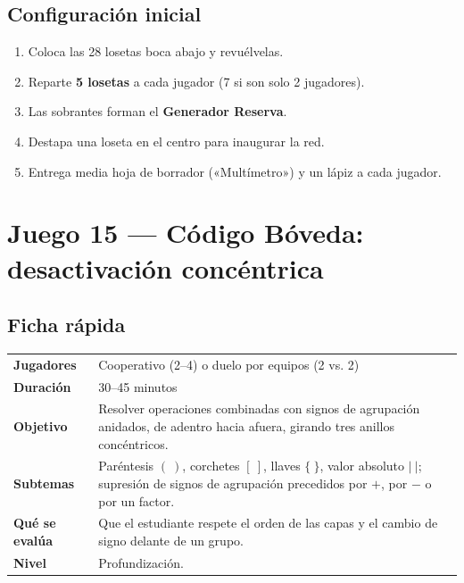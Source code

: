 \documentclass[12pt, letterpaper]{article}
\newcommand{\abs}[1]{\lvert #1\rvert}
\begin{document}
\subsection{Configuración inicial}

\begin{enumerate}[leftmargin=*]
  \item Coloca las 28 losetas boca abajo y revuélvelas.
  \item Reparte \textbf{5 losetas} a cada jugador (7 si son solo 2 jugadores).
  \item Las sobrantes forman el \textbf{Generador Reserva}.
  \item Destapa una loseta en el centro para inaugurar la red.
  \item Entrega media hoja de borrador («Multímetro») y un lápiz a cada jugador.
\end{enumerate}

\clearpage
\section{Juego 15 — Código Bóveda: desactivación concéntrica}

\subsection{Ficha rápida}

\begin{center}
\small
\begin{tabular}{@{}p{3cm} p{12.2cm}@{}}
\toprule
\textbf{Jugadores} & Cooperativo (2--4) o duelo por equipos (2 vs. 2)\\
\textbf{Duración} & 30--45 minutos\\
\textbf{Objetivo} & Resolver operaciones combinadas con signos de agrupación anidados, de adentro hacia afuera, girando tres anillos concéntricos.\\
\textbf{Subtemas} & Paréntesis $(~)$, corchetes $[~]$, llaves $\{~\}$, valor absoluto $\abs{~}$; supresión de signos de agrupación precedidos por $+$, por $-$ o por un factor.\\
\textbf{Qué se evalúa} & Que el estudiante respete el orden de las capas y el cambio de signo delante de un grupo.\\
\textbf{Nivel} & Profundización.\\
\bottomrule
\end{tabular}
\end{center}
\end{document}
